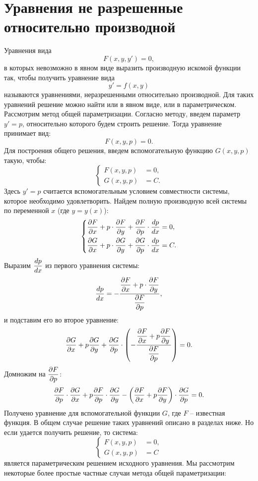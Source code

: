 \section{Уравнения не разрешенные относительно производной}

	Уравнения вида
	\[ F(x, y, y') = 0, \]
	в которых невозможно в явном виде выразить производную искомой функции так, чтобы получить уравнение вида
	\[ y' = f(x, y) \]
	называются уравнениями, неразрешенными относительно производной. Для таких уравнений решение можно найти или в явном виде, или в параметрическом. Рассмотрим метод общей параметризации. Согласно методу, введем параметр $y' = p$, относительно которого будем строить решение. Тогда уравнение принимает вид:
	\[ F(x, y, p) = 0. \]
	Для построения общего решения, введем вспомогательную функцию $G(x, y, p)$ такую, чтобы:
	\[ \left\lbrace \begin{split} F(x, y, p) &= 0, \\ G(x, y, p) &= C. \end{split} \right. \]
	Здесь $y' = p$ считается вспомогательным условием совместности системы, которое необходимо удовлетворить. Найдем полную производную всей системы по переменной $x$ (где $y = y(x)$):
	\[ \left\lbrace \begin{split} 
		\dfrac{\partial F}{\partial x} + p \cdot \dfrac{\partial F}{\partial y} + \dfrac{\partial F}{\partial p} \cdot \dfrac{d p}{d x} &= 0, \\ 
		\dfrac{\partial G}{\partial x} + p \cdot \dfrac{\partial G}{\partial y} + \dfrac{\partial G}{\partial p} \cdot \dfrac{d p}{d x} &= C. 
	\end{split} \right. \]
	Выразим $\dfrac{d p}{d x}$ из первого уравнения системы:
	\[ \dfrac{d p}{d x} = -\frac{\dfrac{\partial F}{\partial x} + p \cdot \dfrac{\partial F}{\partial y}}{\dfrac{\partial F}{\partial p}}, \]
	и подставим его во второе уравнение:
	\[ \dfrac{\partial G}{\partial x} + p \dfrac{\partial G}{\partial y} + \dfrac{\partial G}{\partial p} \cdot \left(  -\frac{\dfrac{\partial F}{\partial x} + p \dfrac{\partial F}{\partial y}}{\dfrac{\partial F}{\partial p}}  \right) = 0. \]
	Домножим на $\dfrac{\partial F}{\partial p}$:
	\[ \dfrac{\partial F}{\partial p} \cdot \dfrac{\partial G}{\partial x} + p \dfrac{\partial F}{\partial p} \cdot \dfrac{\partial G}{\partial y} - \left(  \dfrac{\partial F}{\partial x} + p \dfrac{\partial F}{\partial y}  \right) \cdot \dfrac{\partial G}{\partial p} = 0. \]
	Получено уравнение для вспомогательной функции $G$, где $F$ -- известная функция. В общем случае решение таких уравнений описано в разделах ниже. Но если удается получить решение, то система:
	\[ \left\lbrace \begin{split} F(x, y, p) &= 0, \\ G(x, y, p) &= C \end{split} \right. \]
	является параметрическим решением исходного уравнения. Мы рассмотрим некоторые более простые частные случаи метода общей параметризации:
